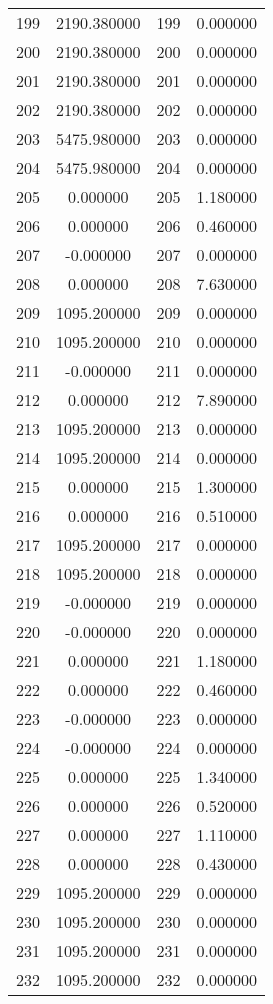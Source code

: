 \documentclass[12pt]{article}
\begin{document}
\begin{longtable}{@{}cccc@{}}
199 & 2190.380000 & 199 & 0.000000 \\
200 & 2190.380000 & 200 & 0.000000 \\
201 & 2190.380000 & 201 & 0.000000 \\
202 & 2190.380000 & 202 & 0.000000 \\
203 & 5475.980000 & 203 & 0.000000 \\
204 & 5475.980000 & 204 & 0.000000 \\
205 & 0.000000 & 205 & 1.180000 \\
206 & 0.000000 & 206 & 0.460000 \\
207 & -0.000000 & 207 & 0.000000 \\
208 & 0.000000 & 208 & 7.630000 \\
209 & 1095.200000 & 209 & 0.000000 \\
210 & 1095.200000 & 210 & 0.000000 \\
211 & -0.000000 & 211 & 0.000000 \\
212 & 0.000000 & 212 & 7.890000 \\
213 & 1095.200000 & 213 & 0.000000 \\
214 & 1095.200000 & 214 & 0.000000 \\
215 & 0.000000 & 215 & 1.300000 \\
216 & 0.000000 & 216 & 0.510000 \\
217 & 1095.200000 & 217 & 0.000000 \\
218 & 1095.200000 & 218 & 0.000000 \\
219 & -0.000000 & 219 & 0.000000 \\
220 & -0.000000 & 220 & 0.000000 \\
221 & 0.000000 & 221 & 1.180000 \\
222 & 0.000000 & 222 & 0.460000 \\
223 & -0.000000 & 223 & 0.000000 \\
224 & -0.000000 & 224 & 0.000000 \\
225 & 0.000000 & 225 & 1.340000 \\
226 & 0.000000 & 226 & 0.520000 \\
227 & 0.000000 & 227 & 1.110000 \\
228 & 0.000000 & 228 & 0.430000 \\
229 & 1095.200000 & 229 & 0.000000 \\
230 & 1095.200000 & 230 & 0.000000 \\
231 & 1095.200000 & 231 & 0.000000 \\
232 & 1095.200000 & 232 & 0.000000 \\

\end{longtable}
\end{document}
